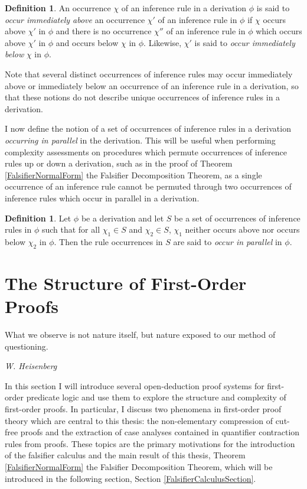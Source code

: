 \documentclass[10pt]{article}
\theoremstyle{definition}\newtheorem{remark}[theorem]{Remark}
\theoremstyle{definition}\newtheorem{example}[theorem]{Example}
\theoremstyle{definition}\newtheorem{definition}[theorem]{Definition}
\begin{document}
	\begin{definition}
		An occurrence $\chi$ of an inference rule in a derivation $\phi$ is said to \textit{occur immediately above} an occurrence $\chi'$ of an inference rule in $\phi$ if $\chi$ occurs above $\chi'$ in $\phi$ and there is no occurrence $\chi''$ of an inference rule in $\phi$ which occurs above $\chi'$ in $\phi$ and occurs below $\chi$ in $\phi$. Likewise, $\chi'$ is said to \textit{occur immediately below} $\chi$ in $\phi$.
	\end{definition}

	Note that several distinct occurrences of inference rules may occur immediately above or immediately below an occurrence of an inference rule in a derivation, so that these notions do not describe unique occurrences of inference rules in a derivation.
	
	I now define the notion of a set of occurrences of inference rules in a derivation \textit{occurring in parallel} in the derivation. This will be useful when performing complexity assessments on procedures which permute occurrences of inference rules up or down a derivation, such as in the proof of Theorem \ref{FalsifierNormalForm} the Falsifier Decomposition Theorem, as a single occurrence of an inference rule cannot be permuted through two occurrences of inference rules which occur in parallel in a derivation.
	
	\begin{definition}
		Let $\phi$ be a derivation and let $S$ be a set of occurrences of inference rules in $\phi$ such that for all $\chi_1 \in S$ and $\chi_2 \in S$, $\chi_1$ neither occurs above nor occurs below $\chi_2$ in $\phi$. Then the rule occurrences in $S$ are said to \textit{occur in parallel} in $\phi$.
	\end{definition}
	
	\pagebreak
	
	\section{The Structure of First-Order Proofs}\label{StructureSection}
	
	\epigraph{What we observe is not nature itself, but nature exposed to our method of questioning.}{\textit{W. Heisenberg}}
	
	\noindent
	In this section I will introduce several open-deduction proof systems for first-order predicate logic and use them to explore the structure and complexity of first-order proofs. In particular, I discuss two phenomena in first-order proof theory which are central to this thesis: the non-elementary compression of cut-free proofs and the extraction of case analyses contained in quantifier contraction rules from proofs. These topics are the primary motivations for the introduction of the falsifier calculus and the main result of this thesis, Theorem \ref{FalsifierNormalForm} the Falsifier Decomposition Theorem, which will be introduced in the following section, Section \ref{FalsifierCalculusSection}.
	
\end{document}
